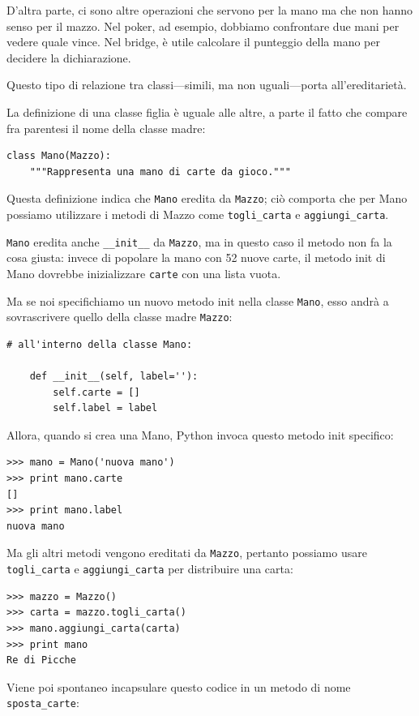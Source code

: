 \documentclass[10pt]{book}
\begin{document}
D'altra parte, ci sono altre operazioni che servono per la mano ma che non hanno senso per il mazzo. Nel poker, ad esempio, dobbiamo  confrontare due mani per vedere quale vince. Nel bridge, è utile calcolare il punteggio della mano per decidere la dichiarazione.

Questo tipo di relazione tra classi---simili, ma non uguali---porta all'ereditarietà.

La definizione di una classe figlia è uguale alle altre, a parte il fatto che compare fra parentesi il nome della classe madre:

\begin{verbatim}
class Mano(Mazzo):
    """Rappresenta una mano di carte da gioco."""
\end{verbatim}
%
Questa definizione indica che {\tt Mano} eredita da {\tt Mazzo};
ciò comporta che per Mano possiamo utilizzare i metodi di Mazzo come \verb"togli_carta" e \verb"aggiungi_carta".

{\tt Mano} eredita anche \verb"__init__" da {\tt Mazzo}, ma in questo caso il metodo non fa la cosa giusta: invece di popolare la mano con 52 nuove carte, il metodo init di Mano dovrebbe inizializzare {\tt carte} con una lista vuota.

Ma se noi specifichiamo un nuovo metodo init nella classe {\tt Mano}, esso andrà a sovrascrivere quello della classe madre {\tt Mazzo}:

\begin{verbatim}
# all'interno della classe Mano:

    def __init__(self, label=''):
        self.carte = []
        self.label = label
\end{verbatim}
%
Allora, quando si crea una Mano, Python invoca questo metodo init specifico:

\begin{verbatim}
>>> mano = Mano('nuova mano')
>>> print mano.carte
[]
>>> print mano.label
nuova mano
\end{verbatim}
%
Ma gli altri metodi vengono ereditati da {\tt Mazzo}, pertanto possiamo usare \verb"togli_carta" e \verb"aggiungi_carta" per distribuire una carta:

\begin{verbatim}
>>> mazzo = Mazzo()
>>> carta = mazzo.togli_carta()
>>> mano.aggiungi_carta(carta)
>>> print mano
Re di Picche
\end{verbatim}
%
Viene poi spontaneo incapsulare questo codice in un metodo di nome \verb"sposta_carte":
\end{document}
